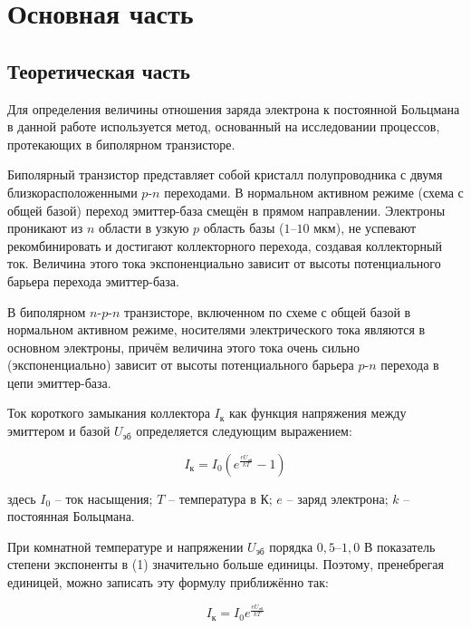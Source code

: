 \documentclass[a4paper,14pt]{extarticle}
\theoremstyle{plain}
\theoremstyle{remark}
\theoremstyle{definition}
\begin{document}
\newpage


\section{Основная часть}
\subsection{Теоретическая часть}

Для определения величины отношения заряда электрона к постоянной Больцмана в данной работе используется метод, основанный на исследовании процессов, протекающих в биполярном транзисторе.

Биполярный транзистор представляет собой кристалл полупроводника с двумя близкорасположенными $p$-$n$ переходами. В нормальном активном режиме (схема с общей базой) переход эмиттер-база смещён в прямом направлении. Электроны проникают из $n$ области в узкую $p$ область базы ($1$–$10$ мкм), не успевают рекомбинировать и достигают коллекторного перехода, создавая коллекторный ток. Величина этого тока экспоненциально зависит от высоты потенциального барьера перехода эмиттер-база.

В биполярном $n$-$p$-$n$ транзисторе, включенном по схеме с общей базой в нормальном активном режиме, носителями электрического тока являются в основном электроны, причём величина этого тока очень сильно (экспоненциально) зависит от высоты потенциального барьера $p$-$n$ перехода в цепи эмиттер-база.


Ток короткого замыкания коллектора $I_{\text{к}}$ как функция напряжения между эмиттером и базой $U_{\text{эб}}$ определяется следующим выражением:

\begin{equation}
    I_{\text{к}} = I_0 \left( e^{\frac{e U_{\text{эб}}}{k T}} - 1 \right) \tag{1}
\end{equation}

здесь $I_0$ – ток насыщения; $T$ – температура в К; $e$ – заряд электрона; $k$ – постоянная Больцмана.

При комнатной температуре и напряжении $U_{\text{эб}}$ порядка $0,5$–$1,0$ В показатель степени экспоненты в (1) значительно больше единицы. Поэтому, пренебрегая единицей, можно записать эту формулу приближённо так:

\begin{equation}
    I_{\text{к}} = I_0 e^{\frac{e U_{\text{эб}}}{k T}} \tag{2}
\end{equation}
\end{document}
